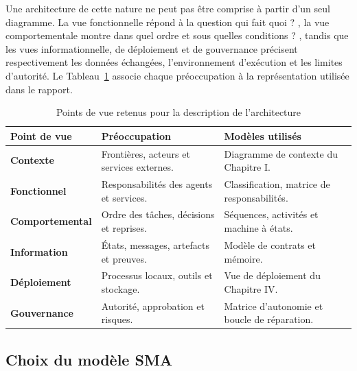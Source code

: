 Une architecture de cette nature ne peut pas être comprise à partir d'un seul diagramme. La vue fonctionnelle répond à la question \og qui fait quoi ? \fg{}, la vue comportementale montre \og dans quel ordre et sous quelles conditions ? \fg{}, tandis que les vues informationnelle, de déploiement et de gouvernance précisent respectivement les données échangées, l'environnement d'exécution et les limites d'autorité. Le Tableau~\ref{tab:viewpoints-ch3} associe chaque préoccupation à la représentation utilisée dans le rapport.

\begin{table}[H]
    \centering
    \caption{Points de vue retenus pour la description de l'architecture}
    \label{tab:viewpoints-ch3}
    \small
    \begin{tabularx}{\textwidth}{|>{\bfseries\RaggedRight\arraybackslash}p{3.2cm}|>{\RaggedRight\arraybackslash}p{4.4cm}|>{\RaggedRight\arraybackslash}X|}
        \hline
        \rowcolor{cgilight!95}
        \textbf{Point de vue} & \textbf{Préoccupation} & \textbf{Modèles utilisés} \\
        \hline
        Contexte & Frontières, acteurs et services externes. & Diagramme de contexte du Chapitre I. \\
        \hline
        Fonctionnel & Responsabilités des agents et services. & Classification, matrice de responsabilités. \\
        \hline
        Comportemental & Ordre des tâches, décisions et reprises. & Séquences, activités et machine à états. \\
        \hline
        Information & États, messages, artefacts et preuves. & Modèle de contrats et mémoire. \\
        \hline
        Déploiement & Processus locaux, outils et stockage. & Vue de déploiement du Chapitre IV. \\
        \hline
        Gouvernance & Autorité, approbation et risques. & Matrice d'autonomie et boucle de réparation. \\
        \hline
    \end{tabularx}
\end{table}

\subsection{Choix du modèle SMA}

